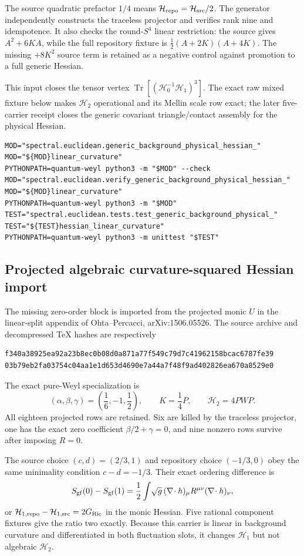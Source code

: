 \documentclass[11pt]{article}
\theoremstyle{definition}
\theoremstyle{remark}
\begin{document}
The source quadratic prefactor $1/4$ means
$\mathcal H_{\rm repo}=\mathcal H_{\rm src}/2$.  The generator independently
constructs the traceless projector and verifies rank nine and idempotence.  It
also checks the round-$S^4$ linear restriction: the source gives
$A^2+6KA$, while the full repository fixture is
$\tfrac12(A+2K)(A+4K)$.  The missing $+8K^2$ source term is retained as a
negative control against promotion to a full generic Hessian.

This input closes the tensor vertex
$\operatorname{Tr}[(\mathcal H_0^{-1}\mathcal H_1)^3]$.  The exact raw
mixed fixture below makes $\mathcal H_2$ operational and its Mellin scale row
exact; the later five-carrier receipt closes the generic covariant
triangle/contact assembly for the physical Hessian.

\begin{verbatim}
MOD="spectral.euclidean.generic_background_physical_hessian_"
MOD="${MOD}linear_curvature"
PYTHONPATH=quantum-weyl python3 -m "$MOD" --check
MOD="spectral.euclidean.verify_generic_background_physical_hessian_"
MOD="${MOD}linear_curvature"
PYTHONPATH=quantum-weyl python3 -m "$MOD"
TEST="spectral.euclidean.tests.test_generic_background_physical_"
TEST="${TEST}hessian_linear_curvature"
PYTHONPATH=quantum-weyl python3 -m unittest "$TEST"
\end{verbatim}

\subsection{Projected algebraic curvature-squared Hessian import}

The missing zero-order block is imported from the projected monic $U$ in the
linear-split appendix of Ohta--Percacci, arXiv:1506.05526.  The source archive
and decompressed TeX hashes are respectively
\begin{verbatim}
f340a38925ea92a23b8ec0b08d0a871a77f549c79d7c41962158bcac6787fe39
03b79eb2fa03754c04aa1e1d653d4690e7a44a7f48f9ad402826ea670a8529e0
\end{verbatim}
The exact pure-Weyl specialization is
\[
 (\alpha,\beta,\gamma)=\left(\frac16,-1,\frac12\right),
 \qquad K=\frac14P,
 \qquad \mathcal H_2=4PWP.
\]
All eighteen projected rows are retained.  Six are killed by the traceless
projector, one has the exact zero coefficient $\beta/2+\gamma=0$, and nine
nonzero rows survive after imposing $R=0$.

The source choice $(c,d)=(2/3,1)$ and repository choice
$(-1/3,0)$ obey the same minimality condition $c-d=-1/3$.  Their exact
ordering difference is
\[
 S_{\rm gf}(0)-S_{\rm gf}(1)
 =\frac12\int\!\sqrt g\,
 (\nabla\!\cdot h)_\mu R^{\mu\nu}(\nabla\!\cdot h)_\nu,
\]
or $\mathcal H_{1,\rm repo}-\mathcal H_{1,\rm src}=2G_{\rm Ric}$ in the
monic Hessian.  Five rational component fixtures give the ratio two exactly.
Because this carrier is linear in background curvature and differentiated in
both fluctuation slots, it changes $\mathcal H_1$ but not algebraic
$\mathcal H_2$.
\end{document}
